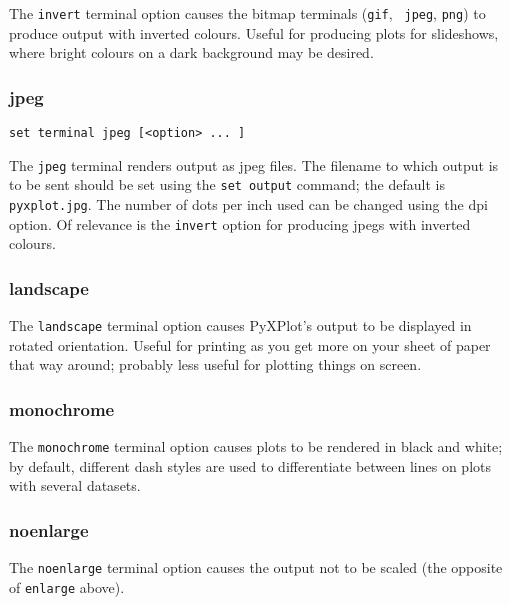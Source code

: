 \documentclass[a4paper,onecolumn,11pt]{book}
\begin{document}
The {\tt invert} terminal option causes the bitmap terminals ({\tt gif}, {\tt
jpeg}, {\tt png}) to produce output with inverted colours. Useful for producing
plots for slideshows, where bright colours on a dark background may be desired.


\subsubsection{jpeg}

\begin{verbatim}
set terminal jpeg [<option> ... ]
\end{verbatim}

The {\tt jpeg} terminal renders output as jpeg files. The filename to which
output is to be sent should be set using the {\tt set output} command; the
default is {\tt pyxplot.jpg}.  The number of dots per inch used can be changed
using the dpi option. Of relevance is the {\tt invert} option for producing
jpegs with inverted colours.

\subsubsection{landscape}

The {\tt landscape} terminal option causes PyXPlot's output to be displayed in
rotated orientation.  Useful for printing as you get more on your sheet of
paper that way around; probably less useful for plotting things on screen.

\subsubsection{monochrome}

The {\tt monochrome} terminal option causes plots to be rendered in black and
white; by default, different dash styles are used to differentiate between
lines on plots with several datasets.

\subsubsection{noenlarge}

The {\tt noenlarge} terminal option causes the output not to be scaled (the
opposite of {\tt enlarge} above).
\end{document}
